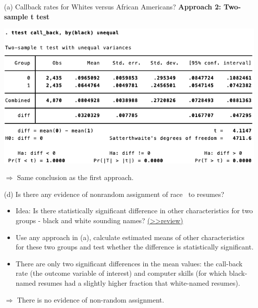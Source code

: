 \documentclass[
  10pt,
  ignorenonframetext,
]{beamer}
\providecommand{\tightlist}{%
  \setlength{\itemsep}{0pt}\setlength{\parskip}{0pt}}
\begin{document}
\begin{frame}{(a) Callback rates for Whites versus African Americans?}
\protect\hypertarget{a-callback-rates-for-whites-versus-african-americans-3}{}
\textbf{Approach 2: Two-sample t test} \footnotesize

\begin{center}\includegraphics[width=0.85\linewidth]{pictures/res2-ttestBlack} \end{center}

\normalsize

\(\Rightarrow\) Same conclusion as the first approach.
\end{frame}

\begin{frame}{(d) Is there any evidence of nonrandom assignment of race
~to resumes?}
\protect\hypertarget{d-is-there-any-evidence-of-nonrandom-assignment-of-race-to-resumes}{}
\begin{itemize}
\tightlist
\item
  Idea: Is there statistically significant difference in other
  characteristics for two groups - black and white sounding names?
  \footnotesize \protect\hyperlink{RCTC}{(\textgreater\textgreater review)}
  \normalsize
\end{itemize}

\vspace{0.8mm}

\begin{itemize}
\tightlist
\item
  Use any approach in (a), calculate estimated means of other
  characteristics for these two groups and test whether the difference
  is statistically significant.
\end{itemize}

\vspace{0.8mm}

\begin{itemize}
\tightlist
\item
  There are only two significant differences in the mean values: the
  call-back rate (the outcome variable of interest) and computer skills
  (for which black-named resumes had a slightly higher fraction that
  white-named resumes).
\end{itemize}

\(\Rightarrow\) There is no evidence of non-random assignment.
\end{frame}
\end{document}
